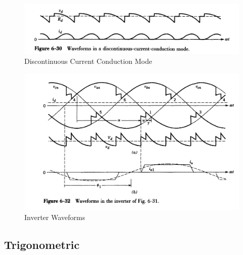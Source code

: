 \documentclass[twocolumn, ]{article}
\begin{document}
\begin{itemize}
\begin{figure}[!ht]
	\includegraphics[scale=0.27]{dcm.png}
	\caption{Discontinuous Current Conduction Mode}
\end{figure}

\begin{figure}[!ht]
	\includegraphics[scale=0.25]{inverter.png}
	\caption{Inverter Waveforms}
\end{figure}


\end{itemize}




\subsection*{ \small Trigonometric }
\end{document}
